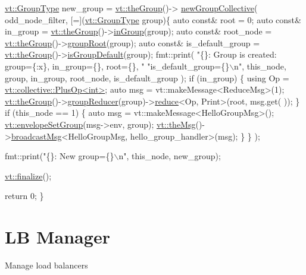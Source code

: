\begin{DoxyCodeInclude}
  \hyperlink{namespacevt_a27b5e4411c9b6140c49100e050e2f743}{vt::GroupType} new\_group = \hyperlink{namespacevt_a4548473dce44fb654400009e2b2fe64e}{vt::theGroup}()->
      \hyperlink{structvt_1_1group_1_1_group_manager_a92b301d6cf77af7d57ed822c6f044d58}{newGroupCollective}(
    odd\_node\_filter, [=](\hyperlink{namespacevt_a27b5e4411c9b6140c49100e050e2f743}{vt::GroupType} group)\{
      \textcolor{keyword}{auto} \textcolor{keyword}{const}& root = 0;
      \textcolor{keyword}{auto} \textcolor{keyword}{const}& in\_group = \hyperlink{namespacevt_a4548473dce44fb654400009e2b2fe64e}{vt::theGroup}()->\hyperlink{structvt_1_1group_1_1_group_manager_a2204bcd119aaf06e0e356957faad36e6}{inGroup}(group);
      \textcolor{keyword}{auto} \textcolor{keyword}{const}& root\_node = \hyperlink{namespacevt_a4548473dce44fb654400009e2b2fe64e}{vt::theGroup}()->\hyperlink{structvt_1_1group_1_1_group_manager_ab5b8178a37165903c73f9159c9259cf5}{groupRoot}(group);
      \textcolor{keyword}{auto} \textcolor{keyword}{const}& is\_default\_group = \hyperlink{namespacevt_a4548473dce44fb654400009e2b2fe64e}{vt::theGroup}()->\hyperlink{structvt_1_1group_1_1_group_manager_ad4d55f7bcf2aadd97c858b3f11c5d365}{isGroupDefault}(group);
      fmt::print(
        \textcolor{stringliteral}{"\{\}: Group is created: group=\{:x\}, in\_group=\{\}, root=\{\}, "}
        \textcolor{stringliteral}{"is\_default\_group=\{\}\(\backslash\)n"},
        this\_node, group, in\_group, root\_node, is\_default\_group
      );
      \textcolor{keywordflow}{if} (in\_group) \{
        \textcolor{keyword}{using} Op = \hyperlink{structvt_1_1collective_1_1reduce_1_1operators_1_1_plus_op}{vt::collective::PlusOp<int>};
        \textcolor{keyword}{auto} msg = vt::makeMessage<ReduceMsg>(1);
        \hyperlink{namespacevt_a4548473dce44fb654400009e2b2fe64e}{vt::theGroup}()->\hyperlink{structvt_1_1group_1_1_group_manager_a3234e5be55c32ccfb56785265e26b4c6}{groupReducer}(group)->\hyperlink{structvt_1_1collective_1_1reduce_1_1_reduce_adf8bd9748a220a3ed29087c30f8adafc}{reduce}<Op, Print>(root, msg.get(
      ));
      \}
      \textcolor{keywordflow}{if} (this\_node == 1) \{
        \textcolor{keyword}{auto} msg = vt::makeMessage<HelloGroupMsg>();
        \hyperlink{namespacevt_a9f9d4ce6034c0eaaf98bdffd33d0e1c7}{vt::envelopeSetGroup}(msg->env, group);
        \hyperlink{namespacevt_aeafd31f866aeb4dc6fc2f6ee97136350}{vt::theMsg}()->\hyperlink{group__typesafehan_ga1a347aac6b6b8d47c9b1c8cc11b7f33e}{broadcastMsg}<HelloGroupMsg, hello\_group\_handler>(msg);
      \}
    \}
  );

  fmt::print(\textcolor{stringliteral}{"\{\}: New group=\{\}\(\backslash\)n"}, this\_node, new\_group);

  \hyperlink{namespacevt_a540d90dbd6e97b69f1dcbc9ee9314cff}{vt::finalize}();

  \textcolor{keywordflow}{return} 0;
\}
\end{DoxyCodeInclude}
\hypertarget{lb-manager}{}\section{LB Manager}\label{lb-manager}
Manage load balancers

